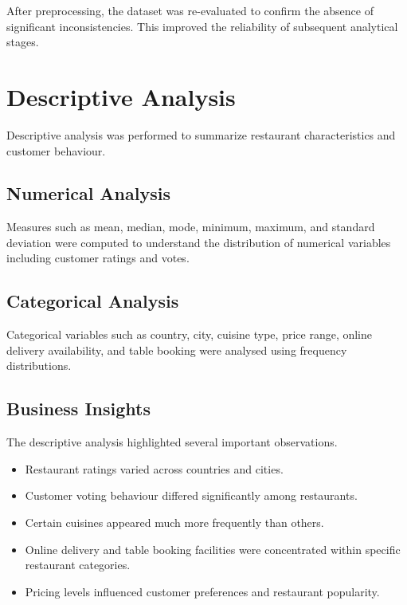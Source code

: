\documentclass[12pt,a4paper]{report}
\begin{document}
After preprocessing, the dataset was re-evaluated to confirm the absence of significant inconsistencies. This improved the reliability of subsequent analytical stages.

\section{Descriptive Analysis}

Descriptive analysis was performed to summarize restaurant characteristics and customer behaviour.

\subsection{Numerical Analysis}

Measures such as mean, median, mode, minimum, maximum, and standard deviation were computed to understand the distribution of numerical variables including customer ratings and votes.

\subsection{Categorical Analysis}

Categorical variables such as country, city, cuisine type, price range, online delivery availability, and table booking were analysed using frequency distributions.

\subsection{Business Insights}

The descriptive analysis highlighted several important observations.

\begin{itemize}
\item Restaurant ratings varied across countries and cities.
\item Customer voting behaviour differed significantly among restaurants.
\item Certain cuisines appeared much more frequently than others.
\item Online delivery and table booking facilities were concentrated within specific restaurant categories.
\item Pricing levels influenced customer preferences and restaurant popularity.
\end{itemize}
\end{document}

